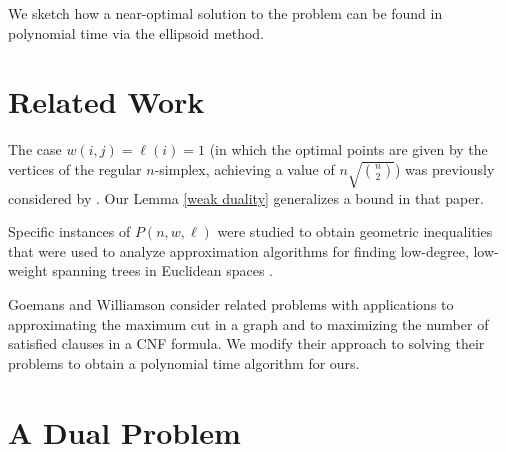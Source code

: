 \documentclass[11pt]{article}
\begin{document}
We sketch how a near-optimal solution to the problem
can be found in polynomial time via the ellipsoid method.

\section{Related Work}

The case $w(i,j) = \ell(i) = 1$
(in which the optimal points are given by the vertices
of the regular $n$-simplex, achieving a value of $n\sqrt{{n \choose 2}}$)
was previously considered by \cite{Li75}.
Our Lemma \ref{weak duality}
generalizes a bound in that paper.

Specific instances of $P(n,w,\ell)$ 
were studied to obtain geometric inequalities 
that were used to analyze approximation algorithms
for finding low-degree, low-weight spanning trees
in Euclidean spaces \cite{KhullerRY94}.

Goemans and Williamson \cite{GoemansW94}
consider related problems with applications
to approximating the maximum cut in a graph
and to maximizing the number of satisfied clauses 
in a CNF formula.
We modify their approach to solving their problems
to obtain a polynomial time algorithm for ours.

\section{A Dual Problem}
\end{document}
